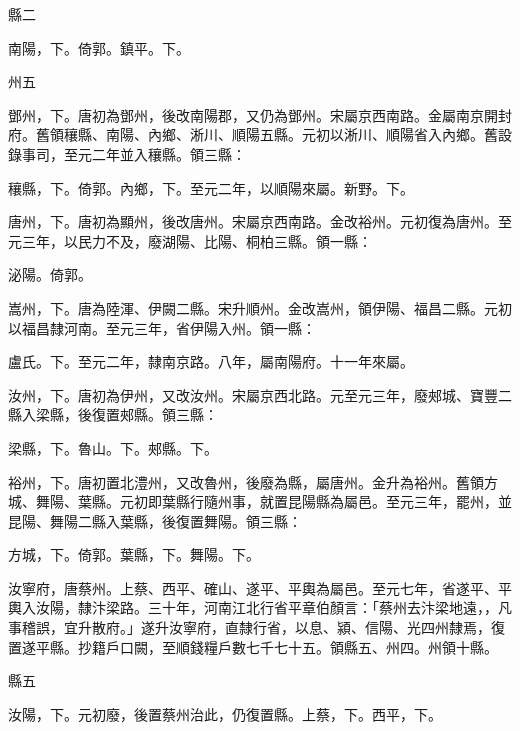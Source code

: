 \begin{pinyinscope}
 縣二



 南陽，下。倚郭。鎮平。下。



 州五



 鄧州，下。唐初為鄧州，後改南陽郡，又仍為鄧州。宋屬京西南路。金屬南京開封府。舊領穰縣、南陽、內鄉、淅川、順陽五縣。元初以淅川、順陽省入內鄉。舊設錄事司，至元二年並入穰縣。領三縣：



 穰縣，下。倚郭。內鄉，下。至元二年，以順陽來屬。新野。下。



 唐州，下。唐初為顯州，後改唐州。宋屬京西南路。金改裕州。元初復為唐州。至元三年，以民力不及，廢湖陽、比陽、桐柏三縣。領一縣：



 泌陽。倚郭。



 嵩州，下。唐為陸渾、伊闕二縣。宋升順州。金改嵩州，領伊陽、福昌二縣。元初以福昌隸河南。至元三年，省伊陽入州。領一縣：



 盧氏。下。至元二年，隸南京路。八年，屬南陽府。十一年來屬。



 汝州，下。唐初為伊州，又改汝州。宋屬京西北路。元至元三年，廢郟城、寶豐二縣入梁縣，後復置郟縣。領三縣：



 梁縣，下。魯山。下。郟縣。下。



 裕州，下。唐初置北澧州，又改魯州，後廢為縣，屬唐州。金升為裕州。舊領方城、舞陽、葉縣。元初即葉縣行隨州事，就置昆陽縣為屬邑。至元三年，罷州，並昆陽、舞陽二縣入葉縣，後復置舞陽。領三縣：



 方城，下。倚郭。葉縣，下。舞陽。下。



 汝寧府，唐蔡州。上蔡、西平、確山、遂平、平輿為屬邑。至元七年，省遂平、平輿入汝陽，隸汴梁路。三十年，河南江北行省平章伯顏言：「蔡州去汴梁地遠，，凡事稽誤，宜升散府。」遂升汝寧府，直隸行省，以息、潁、信陽、光四州隸焉，復置遂平縣。抄籍戶口闕，至順錢糧戶數七千七十五。領縣五、州四。州領十縣。



 縣五



 汝陽，下。元初廢，後置蔡州治此，仍復置縣。上蔡，下。西平，下。




\end{pinyinscope}
